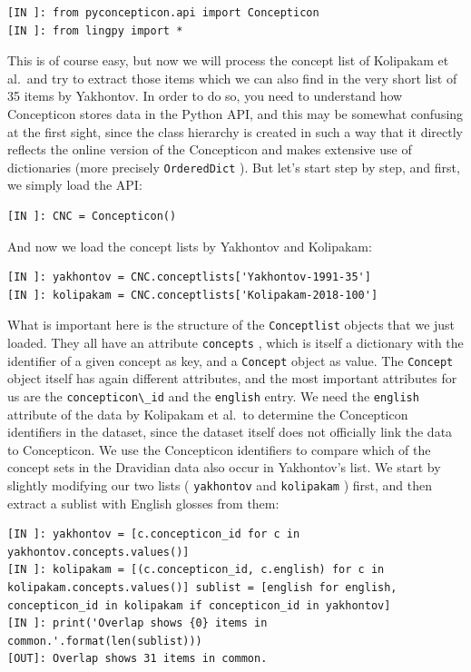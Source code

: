 \documentclass[
  english,
  a4paper,
  oneside,tablecaptionabove
]{scrbook}
\newcommand{\passthrough}[1]{#1}
\begin{document}
\begin{lstlisting}
[IN ]: from pyconcepticon.api import Concepticon
[IN ]: from lingpy import *
\end{lstlisting}

This is of course easy, but now we will process the concept list of
Kolipakam et al.~and try to extract those items which we can also find
in the very short list of 35 items by Yakhontov. In order to do so, you
need to understand how Concepticon stores data in the Python API, and
this may be somewhat confusing at the first sight, since the class
hierarchy is created in such a way that it directly reflects the online
version of the Concepticon and makes extensive use of dictionaries (more
precisely \passthrough{\lstinline!OrderedDict!} ). But let's start step
by step, and first, we simply load the API:

\begin{lstlisting}
[IN ]: CNC = Concepticon()
\end{lstlisting}

And now we load the concept lists by Yakhontov and Kolipakam:

\begin{lstlisting}
[IN ]: yakhontov = CNC.conceptlists['Yakhontov-1991-35']
[IN ]: kolipakam = CNC.conceptlists['Kolipakam-2018-100']
\end{lstlisting}

What is important here is the structure of the
\passthrough{\lstinline!Conceptlist!} objects that we just loaded. They
all have an attribute \passthrough{\lstinline!concepts!} , which is
itself a dictionary with the identifier of a given concept as key, and a
\passthrough{\lstinline!Concept!} object as value. The
\passthrough{\lstinline!Concept!} object itself has again different
attributes, and the most important attributes for us are the
\passthrough{\lstinline!concepticon\_id!} and the
\passthrough{\lstinline!english!} entry. We need the
\passthrough{\lstinline!english!} attribute of the data by Kolipakam et
al.~to determine the Concepticon identifiers in the dataset, since the
dataset itself does not officially link the data to Concepticon. We use
the Concepticon identifiers to compare which of the concept sets in the
Dravidian data also occur in Yakhontov's list. We start by slightly
modifying our two lists ( \passthrough{\lstinline!yakhontov!} and
\passthrough{\lstinline!kolipakam!} ) first, and then extract a sublist
with English glosses from them:

\begin{lstlisting}
[IN ]: yakhontov = [c.concepticon_id for c in yakhontov.concepts.values()]
[IN ]: kolipakam = [(c.concepticon_id, c.english) for c in  kolipakam.concepts.values()] sublist = [english for english, concepticon_id in kolipakam if concepticon_id in yakhontov]
[IN ]: print('Overlap shows {0} items in common.'.format(len(sublist))) 
[OUT]: Overlap shows 31 items in common.
\end{lstlisting}
\end{document}
